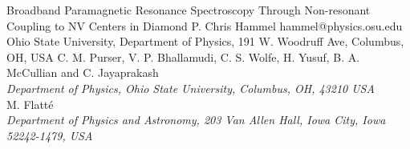\begin{conf-abstract}[]
{Broadband Paramagnetic Resonance Spectroscopy Through Non-resonant Coupling to NV Centers in Diamond}
{\color{blue} P. Chris Hammel}
{hammel@physics.osu.edu}
{Ohio State University, Department of Physics, 191 W. Woodruff Ave, Columbus, OH, USA}
{{\color{blue}C. M. Purser, V. P. Bhallamudi, C. S. Wolfe, H. Yusuf, B. A. McCullian and C. Jayaprakash}\\ \textit{Department of Physics, Ohio State University, Columbus, OH, 43210 USA}\\ 
{\color{blue}M. Flatté}\\ \textit{ Department of Physics and Astronomy, 203 Van Allen Hall, Iowa City, Iowa 52242-1479, USA}\\ 
\decofourleft \decofourright}





\printbibliography[heading=none]

\end{conf-abstract}
